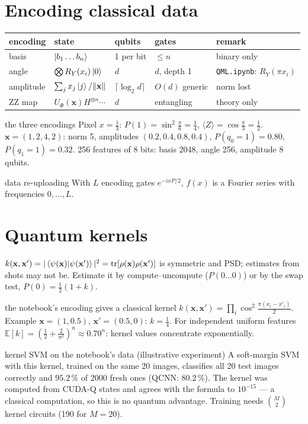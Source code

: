 \documentclass[11pt,a4paper,openany]{book}
\newcounter{wex}[chapter]
\newcommand{\bx}{\mathbf x}
\begin{document}
\section{Encoding classical data}
\begin{center}\small
\begin{tabular}{lllll}\toprule
encoding & state & qubits & gates & remark\\ \midrule
basis & $\ket{b_1\dots b_n}$ & 1 per bit & $\le n$ & binary only\\
angle & $\bigotimes R_Y(x_i)\ket0$ & $d$ & $d$, depth 1 & \texttt{QML.ipynb}: $R_Y(\pi x_i)$\\
amplitude & $\sum_jx_j\ket j/\|\bx\|$ & $\lceil\log_2d\rceil$ & $O(d)$ generic & norm lost\\
ZZ map & $U_\Phi(\bx)H^{\otimes n}\cdots$ & $d$ & entangling & theory only\\ \bottomrule
\end{tabular}
\end{center}
\begin{wexample}{the three encodings}
Pixel $x = \frac13$: $P(1) = \sin^2\frac\pi6 = \frac14$, $\langle Z\rangle = \cos\frac\pi3 = \frac12$.
$\bx = (1, 2, 4, 2)$: norm 5, amplitudes $(0.2, 0.4, 0.8, 0.4)$, $P(q_0 = 1) = 0.80$, $P(q_1 = 1) = 0.32$.
256 features of 8 bits: basis 2048, angle 256, amplitude 8 qubits.
\end{wexample}
\begin{keyres}{data re-uploading}
With $L$ encoding gates $e^{-ixP/2}$, $f(x)$ is a Fourier series with frequencies $0, \dots, L$.
\end{keyres}

\section{Quantum kernels}
$k(\bx, \bx') = |\braket{\psi(\bx)|\psi(\bx')}|^2 = \operatorname{tr}[\rho(\bx)\rho(\bx')]$ is symmetric and PSD; estimates from shots may not be.
Estimate it by compute--uncompute ($P(0\dots0)$) or by the swap test, $P(0) = \frac12(1 + k)$.
\begin{keyres}{the notebook's encoding gives a classical kernel}
$k(\bx, \bx') = \prod_i\cos^2\frac{\pi(x_i - x'_i)}2$. Example $\bx = (1, 0.5)$, $\bx' = (0.5, 0)$: $k = \frac14$.
For independent uniform features $\mathbb E[k] = (\frac12 + \frac2{\pi^2})^n \approx 0.70^n$: kernel values concentrate exponentially.
\end{keyres}
\begin{wexample}{kernel SVM on the notebook's data (illustrative experiment)}
A soft-margin SVM with this kernel, trained on the same 20 images, classifies all 20 test images correctly and $95.2\,\%$ of 2000
fresh ones (QCNN: $80.2\,\%$). The kernel was computed from CUDA-Q states and agrees with the formula to $10^{-15}$ --- a classical
computation, so this is no quantum advantage. Training needs $\binom M2$ kernel circuits (190 for $M = 20$).
\end{wexample}
\end{document}
